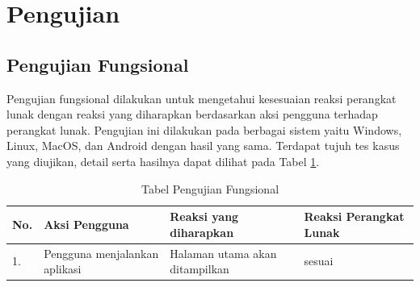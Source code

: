 \section{Pengujian}
\subsection{Pengujian Fungsional}

Pengujian fungsional dilakukan untuk mengetahui kesesuaian reaksi perangkat lunak dengan reaksi yang diharapkan berdasarkan aksi pengguna terhadap perangkat lunak. Pengujian ini dilakukan pada berbagai sistem yaitu Windows, Linux, MacOS, dan Android dengan hasil yang sama. Terdapat tujuh tes kasus yang diujikan, detail serta hasilnya dapat dilihat pada Tabel \ref{table:hasilFungsional}.
			
\begin{table}[H]
	\centering
	\caption{Tabel Pengujian Fungsional}
		\begin{tabular}{|p{0.25cm}| p{3.5cm}| p{7cm}| p{2.5cm}|} \hline
		No.	&	Aksi Pengguna	&	Reaksi yang diharapkan	&	Reaksi Perangkat Lunak \\ \hline
		1.	&	Pengguna menjalankan aplikasi	&	Halaman utama akan ditampilkan	&	sesuai	\\ \hline
		
		\end{tabular}
	\label{table:hasilFungsional}
\end{table}